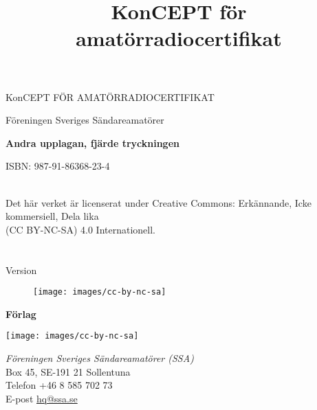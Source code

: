 \onecolumn{}
\vspace{10em}
\title{KonCEPT för amatörradiocertifikat}
\begin{center}
\Large{KonCEPT FÖR AMATÖRRADIOCERTIFIKAT}

Föreningen Sveriges Sändareamatörer

\vspace{2\baselineskip}

\end{center}

\noindent \textbf{Andra upplagan, fjärde tryckningen}

\noindent ISBN: 987-91-86368-23-4

\noindent
\\
\noindent Det här verket är licenserat under Creative Commons:\newline
\noindent Erkännande, Icke kommersiell, Dela lika\\
\noindent (CC BY-NC-SA) 4.0 Internationell.\\
\\
\\
\noindent Version \revision

\begin{figure}[h]
    \texttt{[image: images/cc-by-nc-sa]}
\end{figure}


\vfill \vfill

\noindent
\textbf{Förlag}

\begin{marginfigure}
	\texttt{[image: images/cc-by-nc-sa]}
\end{marginfigure}

\noindent
\textit{Föreningen Sveriges Sändareamatörer (SSA)}\\
Box 45, SE-191 21 Sollentuna\\
Telefon +46 8 585 702 73\\
E-post \href{mailto:hq@ssa.se}{hq@ssa.se}\\[\baselineskip]
\restoregeometry\twocolumn
{}
